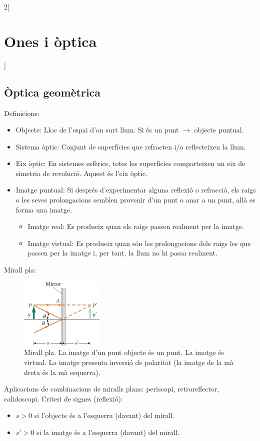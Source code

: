 \documentclass[class=article,10pt,crop=false]{standalone}
\begin{document}
\begin{multicols}{2}[\section{Ones i òptica}]
\subsection{Òptica geomètrica}
Definicions:
\begin{itemize}
    \item Objecte: Lloc de l'espai d'on surt llum. Si és un punt $\rightarrow$ objecte puntual.
    \item Sistema òptic: Conjunt de superfícies que refracten i/o reflecteixen la llum.
    \item Eix òptic: En sistemes esfèrics, totes les superfícies comparteixen un eix de simetria de revolució. Aquest és l'eix òptic.
    \item Imatge puntual: Si després d'ex\-pe\-ri\-men\-tar alguna reflexió o refracció, els raigs o les seves prolongacions semblen provenir d'un punt o anar a un punt, allà es forma una imatge.
    \begin{itemize}
        \item Imatge real: Es produeix quan els raigs passen realment per la imatge.
        \item Imatge virtual: Es produeix quan són les prolongacions dels raigs les que passen per la imatge i, per tant, la llum no hi passa realment.
    \end{itemize}
\end{itemize}
Mirall pla:\newline
\begin{figure}
    \centering
    \includegraphics[width=4cm]{Physics/1st/Ones_i_optica/Imatges/pla.jpg} 
    \caption{Mirall pla. La imatge d'un punt objecte és un punt. La imatge és virtual. La imatge presenta inversió de polaritat (la imatge de la mà dreta és la mà esquerra).}
\end{figure}
Aplicacions de combinacions de miralls plans: periscopi, retroreflector, calidoscopi.\newline
Criteri de signes (reflexió): 
\begin{itemize}
    \item $s>0$ si l'objecte és a l'esquerra (davant) del mirall.
    \item $s'>0$ si la imatge és a l'esquerra (davant) del mirall.

\end{itemize}
\end{multicols}
\end{document}
